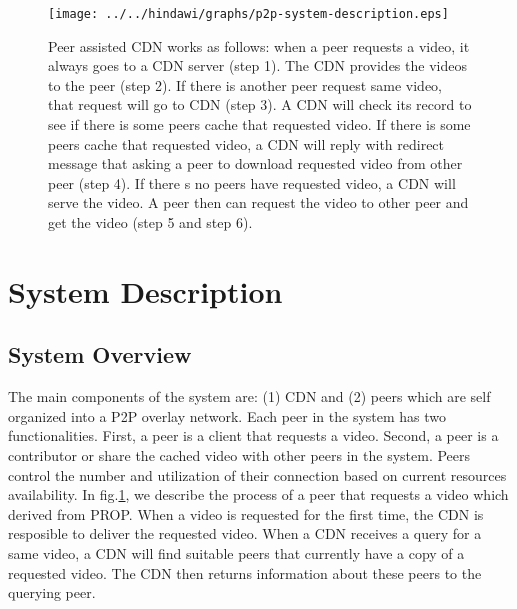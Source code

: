 \begin{figure}[!t]
\begin{center}
\texttt{[image: ../../hindawi/graphs/p2p-system-description.eps]}
\end{center}
\caption{Peer assisted CDN works as follows:
when a peer requests a video, it always goes to a CDN server (step 1). 
The CDN provides the videos to the peer (step 2). 
If there is another peer request same video, that request will go to CDN (step 3).  
A CDN will check its record to see if there is some peers cache that requested video.  
If there is some peers cache that requested video, a CDN will reply with redirect message that asking a peer to download requested video from other peer (step 4).
If there s no peers have requested video, a CDN will serve the video.   
A peer then can request the video to other peer and get the video (step 5 and step 6).
}
\label{fig:p2pcdninteractioninsimulator}
\end{figure} 





\section{System Description}\label{systemdescription}
\subsection{System Overview}\label{systemoverview}

The main components of the system are: (1) CDN and (2) peers which are self organized into a P2P overlay network.
Each peer in the system has two functionalities.
First, a peer is a client that requests a video. 
Second, a peer is a contributor or share the cached video with other peers in the system. 
Peers control the number and utilization of their connection based on current resources availability.
In fig.\ref{fig:p2pcdninteractioninsimulator}, we describe the process of a peer that requests a video which derived from PROP.
When a video is requested for the first time, the CDN is resposible to deliver the requested video.
When a CDN receives a query for a same video, a CDN will find suitable peers that currently have a copy of a requested video.
The CDN then returns information about these peers to the querying peer.




